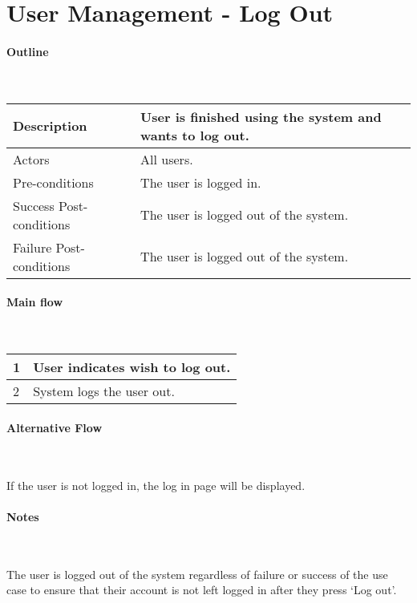 \section*{User Management - Log Out} %

\paragraph*{Outline} \

\begin{tabular}{ | l | l | }
\hline
Description & User is finished using the system and wants to log out. \\ \hline
Actors & All users. \\ \hline
Pre-conditions & The user is logged in. \\ \hline
Success Post-conditions & The user is logged out of the system. \\ \hline
Failure Post-conditions & The user is logged out of the system. \\ \hline
\end{tabular}


\paragraph*{Main flow} \

\begin{tabular}{ | l | l | } \hline
1 & User indicates wish to log out. \\ \hline
2 & System logs the user out. \\ \hline
\end{tabular}


\paragraph*{Alternative Flow} \

If the user is not logged in, the log in page will be displayed.

\paragraph*{Notes} \

The user is logged out of the system regardless of failure or success of the use case to ensure that their account is not left logged in after they press `Log out'.

